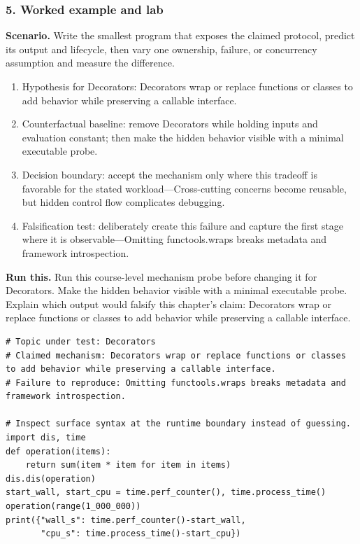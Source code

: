 \subsubsection*{5. Worked example and lab}
\textbf{Scenario.} Write the smallest program that exposes the claimed protocol, predict its output and lifecycle, then vary one ownership, failure, or concurrency assumption and measure the difference.
\begin{enumerate}
\item Hypothesis for Decorators: Decorators wrap or replace functions or classes to add behavior while preserving a callable interface.
\item Counterfactual baseline: remove Decorators while holding inputs and evaluation constant; then make the hidden behavior visible with a minimal executable probe.
\item Decision boundary: accept the mechanism only where this tradeoff is favorable for the stated workload—Cross-cutting concerns become reusable, but hidden control flow complicates debugging.
\item Falsification test: deliberately create this failure and capture the first stage where it is observable—Omitting functools.wraps breaks metadata and framework introspection.
\end{enumerate}
\textbf{Run this.} Run this course-level mechanism probe before changing it for Decorators. Make the hidden behavior visible with a minimal executable probe. Explain which output would falsify this chapter's claim: Decorators wrap or replace functions or classes to add behavior while preserving a callable interface.
\begin{Verbatim}[fontsize=\scriptsize]
# Topic under test: Decorators
# Claimed mechanism: Decorators wrap or replace functions or classes to add behavior while preserving a callable interface.
# Failure to reproduce: Omitting functools.wraps breaks metadata and framework introspection.

# Inspect surface syntax at the runtime boundary instead of guessing.
import dis, time
def operation(items):
    return sum(item * item for item in items)
dis.dis(operation)
start_wall, start_cpu = time.perf_counter(), time.process_time()
operation(range(1_000_000))
print({"wall_s": time.perf_counter()-start_wall,
       "cpu_s": time.process_time()-start_cpu})
\end{Verbatim}
